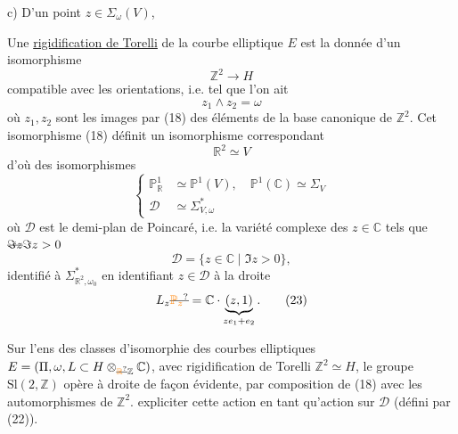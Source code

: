 c) D'un point $z\in\Sigma_\omega(V)$,

Une \uline{rigidification de Torelli} de la courbe elliptique $E$ est la donnée d'un isomorphisme
\[
 \mathbb Z^2\longrightarrow H \tag*{(18)}
\]
compatible avec les orientations, i.e. tel que l'on ait
\[
 z_1\wedge z_2=\omega \tag*{(19)}
\]
où $z_1,z_2$ sont les images par (18) des éléments de la base canonique de $\mathbb Z^2$. Cet isomorphisme (18) définit un isomorphisme correspondant
\[
 \mathbb R^2\simeq V \tag*{(20)}
\]
d'où des isomorphismes
\[
 \left\{\begin{aligned}
 \mathbb P^1_{\mathbb R}&\simeq\mathbb P^1(V),\quad\mathbb P^1(\mathbb C)\simeq\Sigma_V\\
 \mathscr D&\simeq\Sigma_{V,\omega}^*
 \end{aligned}\right. \tag*{(21)}
\]
où $\mathscr D$ est le demi-plan de Poincaré, i.e.  la variété complexe des $z\in\mathbb C$ tels que $\deleted{\Im z}\Im z>0$
\[
 \mathscr D=\{z\in\mathbb C\mid\Im z>0\}, \tag*{(22)}
\]
identifié à $\Sigma_{\mathbb R^2,\omega_0}^*$ en identifiant $z\in\mathscr D$ à la droite
\[
 L_z\deleted{\unsure{\mathbb P_z}}=\mathbb C\cdot\underbrace{(z,1)}_{ze_1+e_2}. \tag*{(23)}
\]

Sur l'ens des classes d'isomorphie des courbes elliptiques $E=(\Pi,\omega,L\subset H\otimes_{\deleted{\unsure{\mathbb R}}\mathbb Z}\mathbb C)$, avec rigidification de Torelli $\mathbb Z^2\simeq H$, le groupe $\mathrm{Sl}(2,\mathbb Z)$ opère à droite de façon évidente, par composition  de (18) avec les automorphismes de $\mathbb Z^2$. 
expliciter cette action en tant qu'action sur $\mathscr D$ (défini par (22)).

